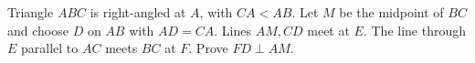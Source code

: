 Triangle $ABC$ is right-angled at $A$, with $CA<AB$. Let $M$ be the midpoint of $BC$ and choose $D$ on $AB$ with $AD=CA$. Lines $AM,CD$ meet at $E$. The line through $E$ parallel to $AC$ meets $BC$ at $F$. Prove $FD\perp AM$.

